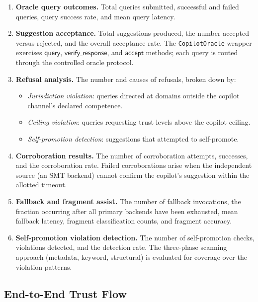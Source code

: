 \documentclass[11pt]{article}
\newcommand{\CopOracle}{\texttt{CopilotOracle}}
\begin{document}
\begin{enumerate}
  \item \textbf{Oracle query outcomes.}  Total queries submitted,
    successful and failed queries, query success rate, and mean
    query latency.

  \item \textbf{Suggestion acceptance.}  Total suggestions
    produced, the number accepted versus rejected, and the
    overall acceptance rate.  The \CopOracle{} wrapper exercises
    $\mathsf{query}$, $\mathsf{verify\_response}$, and
    $\mathsf{accept}$ methods; each query is routed through the
    controlled oracle protocol.

  \item \textbf{Refusal analysis.}  The number and causes of
    refusals, broken down by:
    \begin{itemize}
      \item \emph{Jurisdiction violation}: queries directed at
        domains outside the copilot channel's declared competence.
      \item \emph{Ceiling violation}: queries requesting trust
        levels above the copilot ceiling.
      \item \emph{Self-promotion detection}: suggestions that
        attempted to self-promote.
    \end{itemize}

  \item \textbf{Corroboration results.}  The number of
    corroboration attempts, successes, and the corroboration rate.
    Failed corroborations arise when the independent source (an SMT
    backend) cannot confirm the copilot's suggestion within the
    allotted timeout.

  \item \textbf{Fallback and fragment assist.}  The number of
    fallback invocations, the fraction occurring after all primary
    backends have been exhausted, mean fallback latency, fragment
    classification counts, and fragment accuracy.

  \item \textbf{Self-promotion violation detection.}  The number
    of self-promotion checks, violations detected, and the
    detection rate.  The three-phase scanning approach (metadata,
    keyword, structural) is evaluated for coverage over the
    violation patterns.
\end{enumerate}

\subsection{End-to-End Trust Flow}\label{sec:exp-trust}
\end{document}
